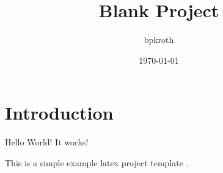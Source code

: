 \documentclass{article}
\title{Blank Project}
\author{bpkroth}
\date{\today}
\begin{document}
\maketitle

\section{Introduction}

Hello World! It works!

This is a simple example latex project template \cite{latex-project-template}.



\end{document}
